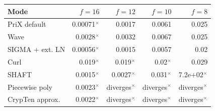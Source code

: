 \begin{tabular}{lrrrr}
\toprule
Mode & $f=16$ & $f=12$ & $f=10$ & $f=8$ \\
\midrule
PriX default & 0.00071$^{\times}$ & 0.0017 & 0.0061 & 0.025 \\
Wave & 0.0028$^{\times}$ & 0.0032 & 0.0067 & 0.025 \\
SIGMA + ext. LN & 0.00056$^{\times}$ & 0.0015 & 0.0057 & 0.02 \\
Curl & 0.019$^{\times}$ & 0.019$^{\times}$ & 0.02$^{\times}$ & 0.029 \\
SHAFT & 0.0015$^{\times}$ & 0.0027$^{\times}$ & 0.031$^{\times}$ & 7.2e+02$^{\times}$ \\
Piecewise poly & 0.0023$^{\times}$ & diverges$^{\times}$ & diverges$^{\times}$ & diverges$^{\times}$ \\
CrypTen approx. & 0.0022$^{\times}$ & diverges$^{\times}$ & diverges$^{\times}$ & diverges$^{\times}$ \\
\bottomrule
\end{tabular}
